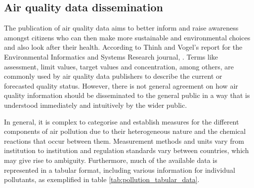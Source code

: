 \subsection{Air quality data dissemination}
The publication of air quality data aims to better inform and raise awareness amongst citizens who can then make more sustainable and environmental choices and also look after their health. According to Thinh and Vogel’s report for the Environmental Informatics and Systems Research journal,  \cite{Thinh2007}. Terms like assessment, limit values, target values and concentration, among others, are commonly used by air quality data publishers to describe the current or forecasted quality status. However, there is not general agreement on how air quality information should be disseminated to the general public in a way that is understood immediately and intuitively by the wider public. 

In general, it is complex to categorise and establish measures for the different components of air pollution due to their heterogeneous nature and the chemical reactions that occur between them. Measurement methods and units vary from institution to institution and regulation standards vary between countries, which may give rise to ambiguity. Furthermore, much of the available data is represented in a tabular format, including various information for individual pollutants, as exemplified in table \ref{tab:pollution_tabular_data}. 

